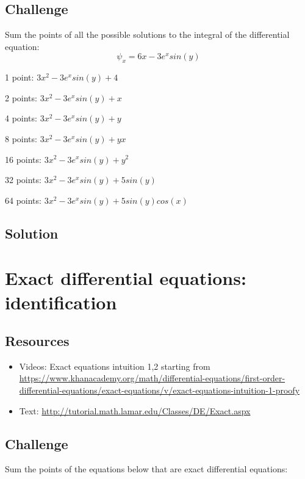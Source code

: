 \subsection*{Challenge}
Sum the points of all the possible solutions to the integral of the differential equation:
\begin{equation}
    \psi_x = 6x - 3e^x sin(y)
\end{equation}

1 point: $3x^2-3e^x sin(y) + 4$

2 points: $3x^2-3e^x sin(y) + x$

4 points: $3x^2-3e^x sin(y) + y$

8 points: $3x^2-3e^x sin(y) + yx$

16 points: $3x^2-3e^x sin(y) + y^2$

32 points: $3x^2-3e^x sin(y) + 5 sin(y)$

64 points: $3x^2-3e^x sin(y) + 5 sin(y)cos(x)$

\subsection*{Solution}
\six{}


\timebox



\newpage
\section{Exact differential equations: identification}
\label{sec:edeid}

\subsection*{Resources}
\begin{itemize}
    \item Videos: Exact equations intuition 1,2 starting from \url{https://www.khanacademy.org/math/differential-equations/first-order-differential-equations/exact-equations/v/exact-equations-intuition-1-proofy}
    \item Text: \url{http://tutorial.math.lamar.edu/Classes/DE/Exact.aspx}
\end{itemize}

\subsection*{Challenge}
Sum the points of the equations below that are exact differential equations:

